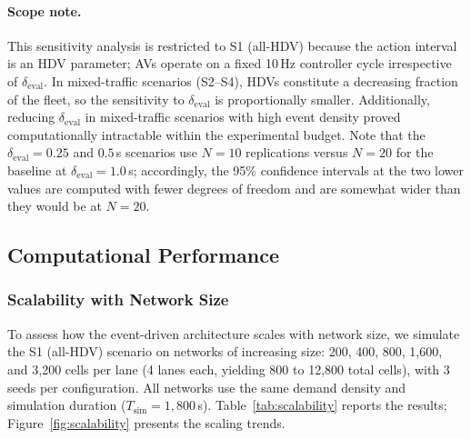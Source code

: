 \documentclass[review,number]{elsarticle} %
\begin{document}
\paragraph{Scope note.} This sensitivity analysis is restricted to S1 (all-HDV) because the action interval is an HDV parameter; AVs operate on a fixed 10\,Hz controller cycle irrespective of $\delta_{\text{eval}}$. In mixed-traffic scenarios (S2--S4), HDVs constitute a decreasing fraction of the fleet, so the sensitivity to $\delta_{\text{eval}}$ is proportionally smaller. Additionally, reducing $\delta_{\text{eval}}$ in mixed-traffic scenarios with high event density proved computationally intractable within the experimental budget. Note that the $\delta_{\text{eval}} = 0.25$ and $0.5$\,s scenarios use $N = 10$ replications versus $N = 20$ for the baseline at $\delta_{\text{eval}} = 1.0$\,s; accordingly, the 95\% confidence intervals at the two lower values are computed with fewer degrees of freedom and are somewhat wider than they would be at $N = 20$.


\subsection{Computational Performance}
\label{sec:exp_performance_new}

\subsubsection{Scalability with Network Size}
\label{sec:exp_scalability}

To assess how the event-driven architecture scales with network size, we simulate the S1 (all-HDV) scenario on networks of increasing size: 200, 400, 800, 1{,}600, and 3{,}200 cells per lane (4 lanes each, yielding 800 to 12{,}800 total cells), with 3 seeds per configuration. All networks use the same demand density and simulation duration ($T_{\text{sim}} = 1{,}800$\,s). Table~\ref{tab:scalability} reports the results; Figure~\ref{fig:scalability} presents the scaling trends.
\end{document}
